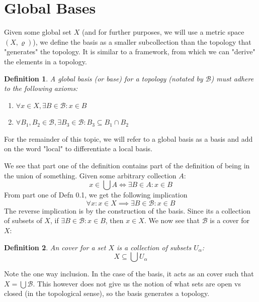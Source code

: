 \documentclass{exam}
\author{Omkar Tasgaonkar}
\newtheorem{defn}{Definition}[section]
\begin{document}
\thispagestyle{firstpage}

\section*{Global Bases}
Given some global set $X$ (and for further purposes, we will use a metric space $(X, \varrho)$), we define the basis as a smaller subcollection than the topology that "generates" the topology. It is similar to a framework, from which we can "derive" the elements in a topology.

\begin{defn}A global basis (or base) for a topology (notated by $\mathcal{B}$) must adhere to the following axioms:
\begin{enumerate}
  \item $\forall x \in X, \exists B \in \mathcal{B}: x \in B$
  \item $\forall B_1, B_2 \in \mathcal{B}, \exists B_3 \in \mathcal{B}: B_3 \subseteq B_1 \cap B_2$
\end{enumerate}
\end{defn}
For the remainder of this topic, we will refer to a global basis as a basis and add on the word "local" to differentiate a local basis.

\medskip
We see that part one of the definition contains part of the definition of being in the union of something. Given some arbitrary collection $A$:
\begin{equation*}
x \in \bigcup A \iff \exists B \in A: x \in B
\end{equation*}
From part one of Defn 0.1, we get the following implication
\begin{equation*}
  \forall x: x \in X \implies \exists B \in \mathcal{B}: x \in B
\end{equation*}
The reverse implication is by the construction of the basis. Since its a collection of subsets of $X$, if $\exists B \in \mathcal{B}: x \in B$, then $x \in X$. We now see that $\mathcal{B}$ is a cover for $X$:
\begin{defn} An cover for a set $X$ is a collection of subsets $U_\alpha$:
\begin{equation*}
  X \subseteq \bigcup U_\alpha
\end{equation*}
\end{defn}
Note the one way inclusion. In the case of the basis, it acts as an cover such that $X = \bigcup \mathcal{B}$. This however does not give us the notion of what sets are open vs closed (in the topological sense), so the basis generates a topology.
\end{document}
